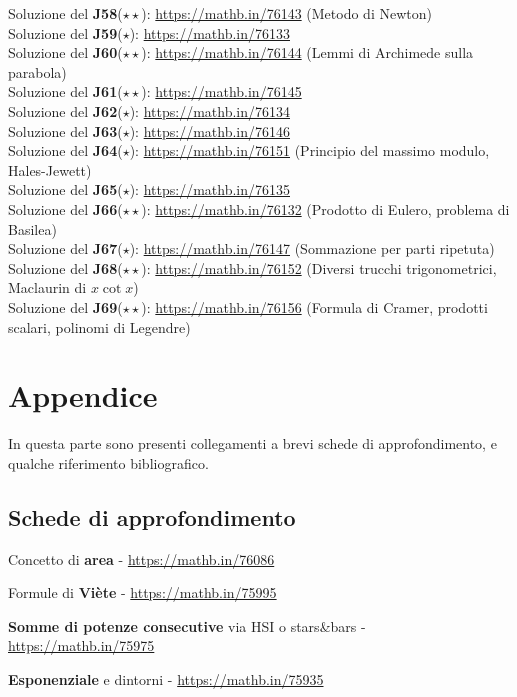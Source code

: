 \documentclass[a4paper,twoside]{article}
\theoremstyle{definition}
\numberwithin{theorem}{section}
\begin{document}
Soluzione del \textbf{J58}($\star\star$): \url{https://mathb.in/76143}  (Metodo di Newton)\\
Soluzione del \textbf{J59}($\star$): \url{https://mathb.in/76133} \\
Soluzione del \textbf{J60}($\star\star$): \url{https://mathb.in/76144} (Lemmi di Archimede sulla parabola)\\
Soluzione del \textbf{J61}($\star\star$): \url{https://mathb.in/76145} \\
Soluzione del \textbf{J62}($\star$): \url{https://mathb.in/76134} \\
Soluzione del \textbf{J63}($\star$): \url{https://mathb.in/76146} \\
Soluzione del \textbf{J64}($\star$): \url{https://mathb.in/76151} (Principio del massimo modulo, Hales-Jewett)\\
Soluzione del \textbf{J65}($\star$): \url{https://mathb.in/76135} \\
Soluzione del \textbf{J66}($\star\star$): \url{https://mathb.in/76132} (Prodotto di Eulero, problema di Basilea)\\
Soluzione del \textbf{J67}($\star$): \url{https://mathb.in/76147} (Sommazione per parti ripetuta)\\
Soluzione del \textbf{J68}($\star\star$): \url{https://mathb.in/76152} (Diversi trucchi trigonometrici, Maclaurin di $x\cot x$)\\
Soluzione del \textbf{J69}($\star\star$): \url{https://mathb.in/76156} (Formula di Cramer, prodotti scalari, polinomi di Legendre)\\

\newpage
\section{Appendice}
In questa parte sono presenti collegamenti a brevi schede di approfondimento, e qualche riferimento bibliografico.

\subsection{Schede di approfondimento}


Concetto di \textbf{area} - \url{https://mathb.in/76086}

Formule di \textbf{Viète} - \url{https://mathb.in/75995}

\textbf{Somme di potenze consecutive} via HSI o stars\&bars - \url{https://mathb.in/75975}

\textbf{Esponenziale} e dintorni - \url{https://mathb.in/75935}
\end{document}
